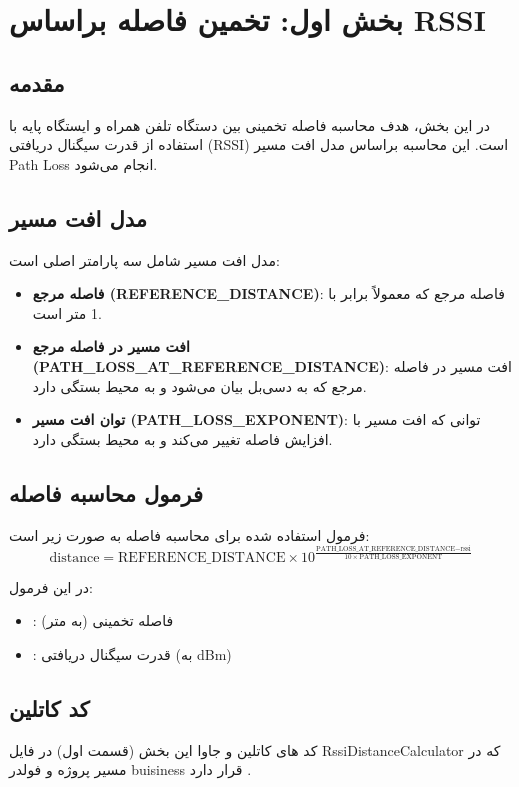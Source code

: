\documentclass[11pt]{article}
\begin{document}
\section{بخش اول: تخمین فاصله براساس RSSI}

\subsection{مقدمه}
در این بخش، هدف محاسبه فاصله تخمینی بین دستگاه تلفن همراه و ایستگاه پایه با استفاده از قدرت سیگنال دریافتی (RSSI) است. این محاسبه براساس مدل افت مسیر Path Loss انجام می‌شود.

\subsection{مدل افت مسیر}
مدل افت مسیر شامل سه پارامتر اصلی است:
\begin{itemize}
    \item \textbf{فاصله مرجع (REFERENCE\_DISTANCE)}: فاصله مرجع که معمولاً برابر با 1 متر است.
    \item \textbf{افت مسیر در فاصله مرجع (PATH\_LOSS\_AT\_REFERENCE\_DISTANCE)}: افت مسیر در فاصله مرجع که به دسی‌بل بیان می‌شود و به محیط بستگی دارد.
    \item \textbf{توان افت مسیر (PATH\_LOSS\_EXPONENT)}: توانی که افت مسیر با افزایش فاصله تغییر می‌کند و به محیط بستگی دارد.
\end{itemize}

\subsection{فرمول محاسبه فاصله}
فرمول استفاده شده برای محاسبه فاصله به صورت زیر است:
\[
\text{distance} = \text{REFERENCE\_DISTANCE} \times 10^{\frac{\text{PATH\_LOSS\_AT\_REFERENCE\_DISTANCE} - \text{rssi}}{10 \times \text{PATH\_LOSS\_EXPONENT}}}
\]

در این فرمول:
\begin{itemize}
    \item {}: فاصله تخمینی (به متر)
    \item {}: قدرت سیگنال دریافتی (به dBm)
\end{itemize}

\subsection{کد کاتلین}
کد های کاتلین و جاوا این بخش (قسمت اول) در فایل RssiDistanceCalculator که در مسیر پروژه و فولدر buisiness قرار دارد .
\end{document}
